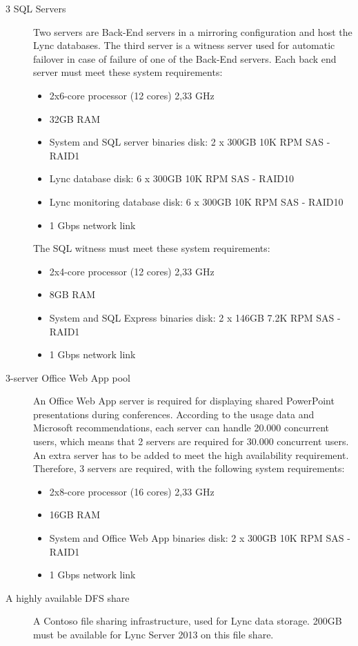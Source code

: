 \begin{description}
		
		\item[3 SQL Servers] Two servers are Back-End servers in a mirroring configuration and host the Lync databases. The third server is a witness server used for automatic failover in case of failure of one of the Back-End servers.
		Each back end server must meet these system requirements:
		\begin{itemize}
			\item 2x6-core processor (12 cores)  2,33 GHz
			\item 32GB RAM
			\item System and SQL server binaries disk: 2 x 300GB 10K RPM SAS - RAID1
			\item Lync database disk: 6 x 300GB 10K RPM SAS - RAID10
			\item Lync monitoring database disk: 6 x 300GB 10K RPM SAS - RAID10
			\item 1 Gbps network link
		\end{itemize}
		The SQL witness must meet these system requirements:
		\begin{itemize}
			\item 2x4-core processor (12 cores)  2,33 GHz
			\item 8GB RAM
			\item System and SQL Express binaries disk: 2 x 146GB 7.2K RPM SAS - RAID1
			\item 1 Gbps network link
		\end{itemize}
		
		
		\item[3-server Office Web App pool] An Office Web App server is required for displaying shared PowerPoint presentations during conferences.
		According to the usage data and Microsoft recommendations, each server can handle 20.000 concurrent users, which means that 2 servers are required for 30.000 concurrent users. An extra server has to be added to meet the high availability requirement. Therefore, 3 servers are required, with the following system requirements:
		\begin{itemize}
			\item 2x8-core processor (16 cores)  2,33 GHz
			\item 16GB RAM
			\item System and Office Web App binaries disk: 2 x 300GB 10K RPM SAS - RAID1
			\item 1 Gbps network link
		\end{itemize}
		
		\item[A highly available DFS share] A Contoso file sharing infrastructure, used for Lync data storage. 200GB must be available for Lync Server 2013 on this file share.
		

\end{description}
